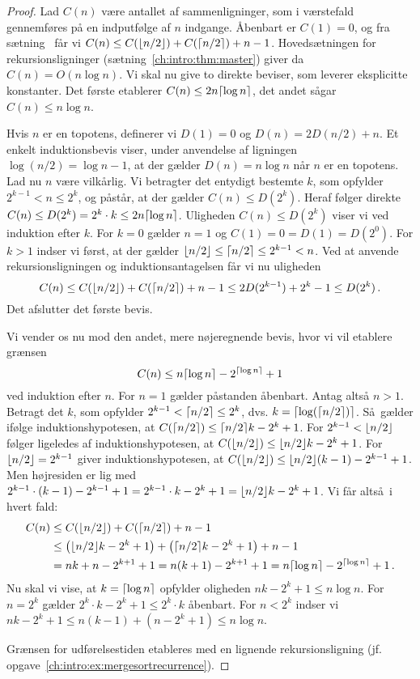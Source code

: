 \begin{proof}
  Lad $C(n)$ være antallet af sammenligninger, som i værstefald gennemføres på en indputfølge af $n$ indgange.
  Åbenbart er $C(1)=0$, og fra sætning~ får vi $C(n) \le C(\lfloor n/2\rfloor)+C(\lceil n/2\rceil)+n-1$.
  Hovedsætningen for rekursionsligninger (sætning~\ref{ch:intro:thm:master})
  giver da $C(n) = O(n \log n)$.
  Vi skal nu give to direkte beviser, som leverer eksplicitte konstanter.
  Det første etablerer $C(n) \le 2n \lceil \log n\rceil$, det andet sågar
 $C(n) \le n \log n$.

 Hvis $n$  er en topotens, definerer vi $D(1) = 0$ og $D(n) = 2D(n/2) + n$. 
 Et enkelt induktionsbevis viser, under anvendelse af ligningen $\log(n/2)=\log n - 1$, 
 at der gælder $D(n) = n \log n$ når $n$ er en topotens.
 Lad nu $n$ være vilkårlig.
  Vi betragter det entydigt bestemte $k$, som opfylder $2^{k-1} < n \le 2^k$, og påstår, at der gælder $C(n) \le D(2^k)$.
  Heraf følger direkte
 $C(n) \le D(2^k) = 2^k\cdot k \le 2n \lceil \log n\rceil$. 
 Uligheden $C(n) \le D(2^k)$ viser vi ved induktion efter $k$. 
 For $k = 0$ gælder $n = 1$ og $C(1) = 0 = D(1) = D(2^0)$.
 For $k > 1$ indser vi først, at der gælder $\lfloor n/2\rfloor \le \lceil n/2\rceil \le 2^{k-1} < n$.
 Ved at anvende rekursionsligningen og induktionsantagelsen får vi nu uligheden
 \[ C(n) \le C(\lfloor n/2\rfloor)+C(\lceil n/2\rceil)+n-1 \le 2D(2^{k-1}) + 2^k - 1 \le
 D(2^k)\,. \] 
 Det afslutter det første bevis.

 Vi vender os nu mod den andet, mere nøjeregnende bevis, hvor vi vil etablere grænsen
 \[ C(n)\leq n\lceil \log n\rceil-2^{\lceil \log n\rceil} + 1 \] 
 ved induktion efter $n$. 
 For $n = 1$ gælder påstanden åbenbart. 
 Antag altså $n>1$.
 Betragt det $k$, som opfylder $2^{k-1}<\lceil n/2\rceil\le 2^k$, dvs. $k = \lceil \log(\lceil n/2\rceil)\rceil$.
 Så gælder ifølge induktionshypotesen, at $C(\lceil n/2\rceil)\le \lceil n/2\rceil k -2^k + 1$.
 For $2^{k-1} < \lfloor n/2\rfloor$ følger ligeledes af induktionshypotesen, at $C(\lfloor n/2\rfloor)\le \lfloor n/2\rfloor k -2^k + 1$.
 For $\lfloor n/2\rfloor=2^{k-1}$ giver induktionshypotesen, at
 $C(\lfloor n/2\rfloor)\le \lfloor n/2\rfloor(k-1) -2^{k-1} + 1$.
 Men højresiden er lig med
 $2^{k-1}\cdot(k-1) -2^{k-1} + 1 = 2^{k-1}\cdot k -2^k+1=\lfloor n/2\rfloor k -2^k + 1$.
 Vi får altså i hvert fald:
 \begin{align*}
   C(n) &\leq C(\lfloor n/2\rfloor)+C(\lceil n/2\rceil)+n-1 \\
   &\le \big(\lfloor n/2\rfloor k -2^k + 1\big)+ \big(\lceil n/2\rceil k -2^k + 1\big) + n - 1 \\
   & =  n k + n - 2^{k+1} + 1 = n(k+1) - 2^{k+1} + 1 = n\lceil \log
   n\rceil-2^{\lceil \log n\rceil} + 1 \,.
 \end{align*}
 Nu skal vi vise, at 
  $k=\lceil \log n\rceil$ opfylder oligheden $nk-2^k + 1 \le n\log n$.
 For $n=2^k$ gælder $2^k\cdot k - 2^k + 1\le 2^k\cdot k$ åbenbart. 
 For $n<2^k$ indser vi $nk-2^k+1 \le n(k-1) + (n-2^k+1) \le n\log n$.

 Grænsen for udførelsestiden etableres med en lignende rekursionsligning
 (jf. opgave~\ref{ch:intro:ex:mergesortrecurrence}).
\end{proof}

